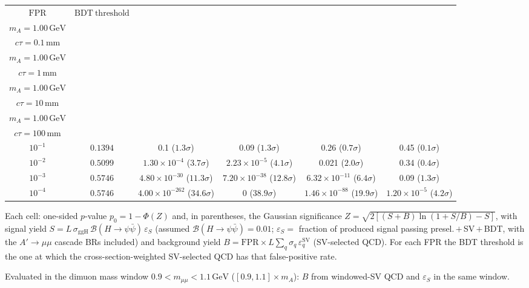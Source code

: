\documentclass[10pt,a4paper]{article}
\begin{document}
{\begin{tabular}{cccccc}
\toprule
$\mathrm{FPR}$ & $\mathrm{BDT\ threshold}$ & \shortstack{$m_{\pi}=10\,\mathrm{GeV}$\\$m_{A}=1.00\,\mathrm{GeV}$\\$c\tau=0.1\,\mathrm{mm}$} & \shortstack{$m_{\pi}=10\,\mathrm{GeV}$\\$m_{A}=1.00\,\mathrm{GeV}$\\$c\tau=1\,\mathrm{mm}$} & \shortstack{$m_{\pi}=10\,\mathrm{GeV}$\\$m_{A}=1.00\,\mathrm{GeV}$\\$c\tau=10\,\mathrm{mm}$} & \shortstack{$m_{\pi}=10\,\mathrm{GeV}$\\$m_{A}=1.00\,\mathrm{GeV}$\\$c\tau=100\,\mathrm{mm}$} \\
\midrule
$10^{-1}$ & $0.1394$ & 0.1 ($1.3\sigma$) & 0.09 ($1.3\sigma$) & 0.26 ($0.7\sigma$) & 0.45 ($0.1\sigma$)\\
$10^{-2}$ & $0.5099$ & $1.30\times10^{-4}$ ($3.7\sigma$) & $2.23\times10^{-5}$ ($4.1\sigma$) & 0.021 ($2.0\sigma$) & 0.34 ($0.4\sigma$)\\
$10^{-3}$ & $0.5746$ & $4.80\times10^{-30}$ ($11.3\sigma$) & $7.20\times10^{-38}$ ($12.8\sigma$) & $6.32\times10^{-11}$ ($6.4\sigma$) & 0.09 ($1.3\sigma$)\\
$10^{-4}$ & $0.5746$ & $4.00\times10^{-262}$ ($34.6\sigma$) & 0 ($38.9\sigma$) & $1.46\times10^{-88}$ ($19.9\sigma$) & $1.20\times10^{-5}$ ($4.2\sigma$)\\
\bottomrule
\end{tabular}

{\small Each cell: one-sided $p$-value $p_0=1-\Phi(Z)$ and, in parentheses, the Gaussian significance $Z=\sqrt{2\left[(S{+}B)\ln(1{+}S/B)-S\right]}$, with signal yield $S=L\,\sigma_{\mathrm{ggH}}\,\mathcal{B}(H\to\psi\bar{\psi})\,\varepsilon_S$ (assumed $\mathcal{B}(H\to\psi\bar{\psi})=0.01$; $\varepsilon_S=$ fraction of produced signal passing presel.\,$+$\,SV\,$+$\,BDT, with the $A'\to\mu\mu$ cascade BRs included) and background yield $B=\mathrm{FPR}\times L\sum_q\sigma_q\,\varepsilon_q^{\mathrm{SV}}$ (SV-selected QCD). For each FPR the BDT threshold is the one at which the cross-section-weighted SV-selected QCD has that false-positive rate.}

{\small Evaluated in the dimuon mass window $0.9<m_{\mu\mu}<1.1\,\mathrm{GeV}$ ($[0.9,1.1]\times m_A$): $B$ from windowed-SV QCD and $\varepsilon_S$ in the same window.}

}\clearpage
\end{document}
